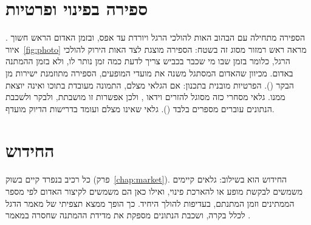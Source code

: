 \section{ספירה בפינוי ופרטיות}
הספירה מתחילה עם הבהוב האות להולכי הרגל ויורדת עד אפס, ובזמן האדום הראש חשוך \cite{fhwa2025mutcd}. איור~\ref{fig:photo} מראה ראש רמזור מסוג זה בשטח: הספירה מוצגת לצד האות הירוק להולכי הרגל, כלומר בזמן שבו מי שכבר בכביש צריך לדעת כמה זמן נותר לו, ולא בזמן ההמתנה באדום. מכיוון שהאדום המסתגל משנה את מועדי המופעים, הספירה מתוזמנת ישירות מן הבקר ().
הפרטיות מובנית בתכנון: אם הגלאי מצלם, התמונה מעובדת בתוכו ואינה יוצאת ממנו. גלאי מסחרי כזה מסוגל להזרים וידאו \cite{agd2024agd645}, ולכן אפשרות זו מושבתת, ולבקר ולשכבת הנתונים עוברים מספרים בלבד (). גלאי שאינו מצלם ועומד בדרישות הדיוק מועדף.


\section{החידוש}
כל רכיב בנפרד קיים בשוק (פרק~\ref{chap:market}). החידוש הוא בשילוב: גלאים קיימים משמשים לבקשת מופע או להארכת פינוי, ואילו כאן הם משמשים לקיצור האדום לפי מספר הממתינים וזמן המתנתם, בעדיפות להולך היחיד. כך הופך ממצא תצפיתי של מאמר הדגל לכלל בקרה, ושכבת הנתונים מספקת את מדידת ההמתנה שחסרה במאמר \cite{rosenbloom2009}.
